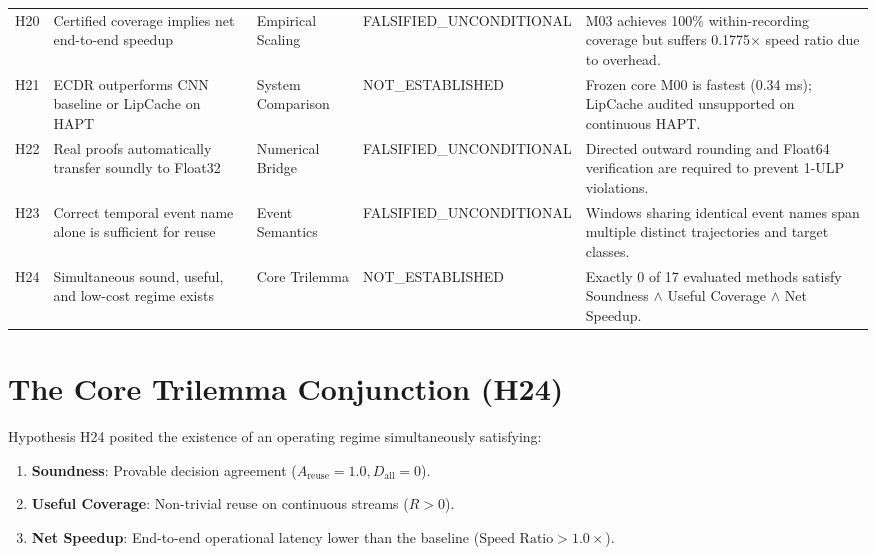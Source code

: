 \documentclass[10pt,twocolumn]{article}
\begin{document}
\begin{table}[t]
{\begin{tabular}{cllll}
H20 & Certified coverage implies net end-to-end speedup & Empirical Scaling & FALSIFIED\_UNCONDITIONAL & M03 achieves 100\% within-recording coverage but suffers 0.1775$\times$ speed ratio due to overhead. \\
H21 & ECDR outperforms CNN baseline or LipCache on HAPT & System Comparison & NOT\_ESTABLISHED & Frozen core M00 is fastest (0.34 ms); LipCache audited unsupported on continuous HAPT. \\
H22 & Real proofs automatically transfer soundly to Float32 & Numerical Bridge & FALSIFIED\_UNCONDITIONAL & Directed outward rounding and Float64 verification are required to prevent 1-ULP violations. \\
H23 & Correct temporal event name alone is sufficient for reuse & Event Semantics & FALSIFIED\_UNCONDITIONAL & Windows sharing identical event names span multiple distinct trajectories and target classes. \\
H24 & Simultaneous sound, useful, and low-cost regime exists & Core Trilemma & NOT\_ESTABLISHED & Exactly 0 of 17 evaluated methods satisfy Soundness $\land$ Useful Coverage $\land$ Net Speedup. \\
\bottomrule
\end{tabular}%
}
\end{table}

\section{The Core Trilemma Conjunction (H24)}

Hypothesis H24 posited the existence of an operating regime simultaneously satisfying:
\begin{enumerate}
    \item \textbf{Soundness}: Provable decision agreement ($A_{\text{reuse}} = 1.0, D_{\text{all}} = 0$).
    \item \textbf{Useful Coverage}: Non-trivial reuse on continuous streams ($R > 0$).
    \item \textbf{Net Speedup}: End-to-end operational latency lower than the baseline ($\text{Speed Ratio} > 1.0\times$).
\end{enumerate}
\end{document}
